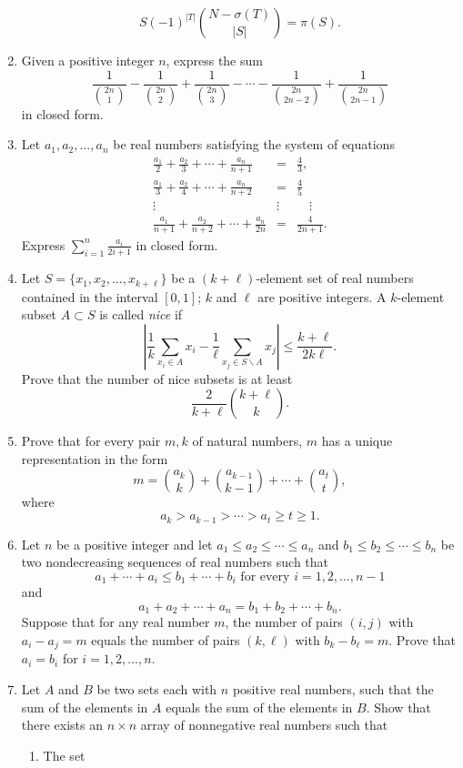\documentclass[12pt]{article}
\begin{document}
\begin{enumerate}
\[{    S}(-1)^{|T|}\binom {N - \sigma(T)}{|S|} = \pi(S).\]
\item Given a positive integer $n$, express the sum \[\frac 1{\binom
  {2n}1} - \frac 1{\binom {2n}2}+ \frac 1{\binom{2n}3}-\cdots-\frac
  1{\binom{2n}{2n-2}}+\frac 1{\binom{2n}{2n-1}}\] in closed form.
\item Let $a_1,a_2,\ldots,a_n$ be real numbers satisfying the system
  of equations \begin{eqnarray*} \frac
    {a_1}2+\frac{a_2}3+\cdots+\frac{a_n}{n+1}&=&\frac 43, \\ \frac
    {a_1}3+\frac {a_2}4+\cdots+\frac {a_n}{n+2}&=& \frac 45 \\ \vdots
    \qquad&\vdots& \quad\vdots \\ \frac {a_1}{n+1}+\frac
    {a_2}{n+2}+\cdots+\frac{a_n}{2n}&=& \frac 4{2n+1}.\end{eqnarray*}  Express
    $\sum_{i=1}^n\frac{a_i}{2i+1}$ in closed form.
\item Let $S=\{x_1,x_2,\ldots,x_{k+\ell}\}$ be a $(k+\ell)$-element
  set of real numbers contained in the interval $[0,1]$; $k$ and $\ell$
  are positive integers.  A $k$-element subset $A\subset S$ is called
  \emph{nice} if \[\left|\frac 1k\sum_{x_i\in A}x_i - \frac
  1\ell\sum_{x_j\in S\backslash A} x_j\right|\leq
  \frac{k+\ell}{2k\ell}.\]  Prove that the number of nice subsets is
  at least \[\frac 2{k+\ell}\binom{k+\ell}k.\]
\item Prove that for every pair $m,k$ of natural numbers, $m$ has a
  unique representation in the form \[m=\binom
  {a_k}k+\binom{a_{k-1}}{k-1}+\cdots+\binom{a_t}t,\]
    where \[a_k>a_{k-1}>\cdots>a_t\geq t\geq 1.\]
\item Let $n$ be a positive integer and let $a_1\leq a_2\leq\cdots\leq
  a_n$ and $b_1\leq b_2\leq\cdots\leq b_n$ be two nondecreasing
  sequences of real numbers such that \[a_1+\cdots+a_i\leq
  b_1+\cdots+b_i\textrm{ for every } i=1,2,\ldots,n-1\]
  and \[a_1+a_2+\cdots+a_n = b_1+b_2+\cdots+b_n.\]  Suppose that for
  any real number $m$, the number of pairs $(i,j)$ with $a_i-a_j=m$
  equals the number of pairs $(k,\ell)$ with $b_k-b_\ell=m$.  Prove
  that $a_i=b_i$ for $i=1,2,\ldots,n$.
\item Let $A$ and $B$ be two sets each with $n$ positive real numbers,
  such that the sum of the elements in $A$ equals the sum of the
  elements in $B$.  Show that there exists an $n\times n$ array of
  nonnegative real numbers such that \begin{enumerate} \item The set

\end{enumerate}
\end{enumerate}
\end{document}

